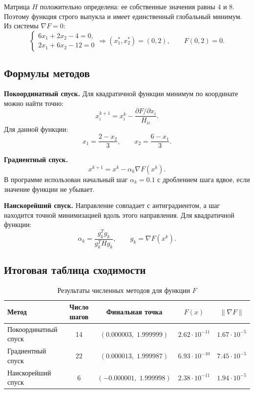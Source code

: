 \documentclass[12pt,a4paper]{article}
\begin{document}
Матрица $H$ положительно определена: ее собственные значения равны $4$ и $8$. Поэтому функция строго выпукла и имеет единственный глобальный минимум. Из системы $\nabla F=0$:
\begin{equation}
  \begin{cases}
    6x_1+2x_2-4=0,\\
    2x_1+6x_2-12=0
  \end{cases}
  \Rightarrow
  \boxed{(x_1^*,x_2^*)=(0,2)}, \qquad F(0,2)=0.
\end{equation}

\subsection{Формулы методов}

\textbf{Покоординатный спуск.} Для квадратичной функции минимум по координате можно найти точно:
\begin{equation}
  x_i^{k+1}=x_i^k-\frac{\partial F/\partial x_i}{H_{ii}}.
\end{equation}
Для данной функции:
\begin{equation}
  x_1=\frac{2-x_2}{3}, \qquad x_2=\frac{6-x_1}{3}.
\end{equation}

\textbf{Градиентный спуск.}
\begin{equation}
  x^{k+1}=x^k-\alpha_k\nabla F(x^k).
\end{equation}
В программе использован начальный шаг $\alpha_k=0.1$ с дроблением шага вдвое, если значение функции не убывает.

\textbf{Наискорейший спуск.} Направление совпадает с антиградиентом, а шаг находится точной минимизацией вдоль этого направления. Для квадратичной функции:
\begin{equation}
  \alpha_k=\frac{g_k^Tg_k}{g_k^THg_k}, \qquad g_k=\nabla F(x^k).
\end{equation}

\subsection{Итоговая таблица сходимости}

\begin{table}[H]
\centering
\caption{Результаты численных методов для функции $F$}
\small
\begin{tabular}{@{}lcccc@{}}
\toprule
Метод & Число шагов & Финальная точка & $F(x)$ & $\|\nabla F\|$ \\
\midrule
Покоординатный спуск & 14 & $(0.000003,\;1.999999)$ & $2.62\cdot 10^{-11}$ & $1.67\cdot 10^{-5}$ \\
Градиентный спуск & 22 & $(0.000013,\;1.999987)$ & $6.93\cdot 10^{-10}$ & $7.45\cdot 10^{-5}$ \\
Наискорейший спуск & 6 & $(-0.000001,\;1.999998)$ & $2.38\cdot 10^{-11}$ & $1.94\cdot 10^{-5}$ \\
\bottomrule
\end{tabular}
\end{table}
\end{document}
